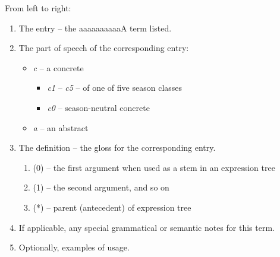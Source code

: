 \documentclass{book}
\newcommand{\lname}{aaaaaaaaaaA}
\begin{document}
From left to right:

\begin{enumerate}
    \item The entry -- the \lname{} term listed.
    \item The part of speech of the corresponding entry:
    \begin{itemize}
        \item \textit{c} -- a concrete
        \begin{itemize}
            \item \textit{c1} -- \textit{c5} -- of one of five season classes
            \item \textit{c0} -- season-neutral concrete
        \end{itemize}
        \item \textit{a} -- an abstract
    \end{itemize}
    \item The definition -- the gloss for the corresponding entry.
    \begin{enumerate}
        \item (0) -- the first argument when used as a stem in an expression tree
        \item (1) -- the second argument, and so on
        \item (*) -- parent (antecedent) of expression tree
    \end{enumerate}
    \item If applicable, any special grammatical or semantic notes for this term.
    \item Optionally, examples of usage.
\end{enumerate}

\begin{multicols}{2}
    
\end{multicols}
\end{document}
